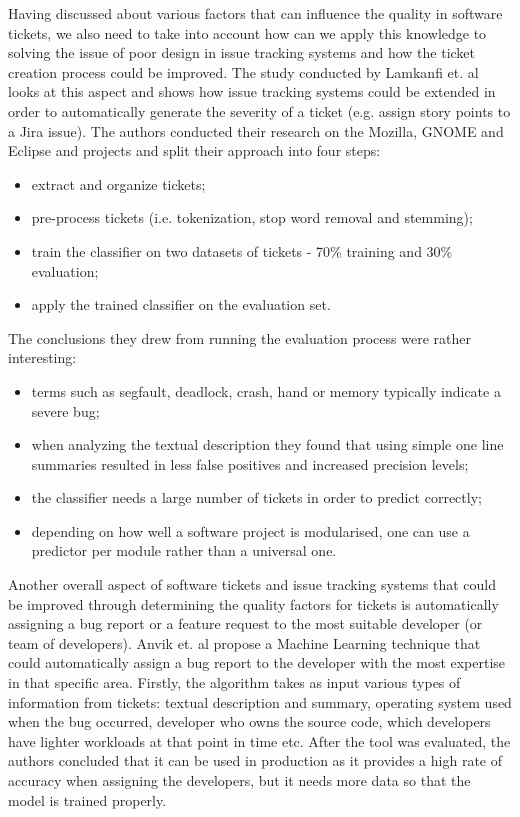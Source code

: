 \documentclass{mpaper}
\begin{document}
Having discussed about various factors that can influence the quality in software tickets, 
we also need to take into account how can we apply this knowledge to solving the issue of 
poor design in issue tracking systems and how the ticket creation process could be improved. 
The study conducted by Lamkanfi et. al \cite{lamkanfi2010predicting} looks at this aspect and
shows how issue tracking systems could be extended in order to automatically generate the severity 
of a ticket (e.g. assign story points to a Jira issue). The authors conducted their research on the Mozilla,
GNOME and Eclipse and projects and split their approach into four steps:
  \begin{itemize}
    \item extract and organize tickets;
    \item pre-process tickets (i.e. tokenization, stop word removal and stemming);
    \item train the classifier on two datasets of tickets - 70\% 
      training and 30\% evaluation;
    \item apply the trained classifier on the evaluation set.
  \end{itemize}
The conclusions they drew from running the evaluation process were rather 
interesting:
  \begin{itemize}
    \item terms such as segfault, deadlock, crash, hand or memory typically indicate
      a severe bug;
    \item when analyzing the textual description they found that using simple
      one line summaries resulted in less false positives and increased precision
      levels;
    \item the classifier needs a large number of tickets in order to predict correctly;
    \item depending on how well a software project is modularised, one can 
      use a predictor per module rather than a universal one.
  \end{itemize}

Another overall aspect of software tickets and issue tracking systems that could be improved through 
determining the quality factors for tickets is automatically assigning a bug report or a feature request 
to the most suitable developer (or team of developers). Anvik et. al \cite{anvik2011reducing}
propose a Machine Learning technique that could automatically assign a bug report to the developer 
with the most expertise in that specific area. Firstly, the algorithm takes as input various types of information from 
tickets: textual description and summary, operating system used when the bug occurred, developer 
who owns the source code, which developers have lighter workloads at that point in time etc. After the 
tool was evaluated, the authors concluded that it can be used in production as it provides a high 
rate of accuracy when assigning the developers, but it needs more data so that the model is trained 
properly.
\end{document}
